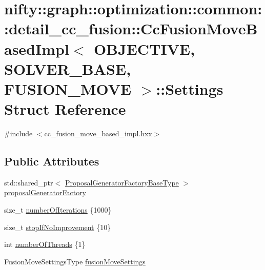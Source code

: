 \hypertarget{structnifty_1_1graph_1_1optimization_1_1common_1_1detail__cc__fusion_1_1CcFusionMoveBasedImpl_1_1Settings}{}\section{nifty\+:\+:graph\+:\+:optimization\+:\+:common\+:\+:detail\+\_\+cc\+\_\+fusion\+:\+:Cc\+Fusion\+Move\+Based\+Impl$<$ O\+B\+J\+E\+C\+T\+I\+V\+E, S\+O\+L\+V\+E\+R\+\_\+\+B\+A\+S\+E, F\+U\+S\+I\+O\+N\+\_\+\+M\+O\+V\+E $>$\+:\+:Settings Struct Reference}
\label{structnifty_1_1graph_1_1optimization_1_1common_1_1detail__cc__fusion_1_1CcFusionMoveBasedImpl_1_1Settings}


{\ttfamily \#include $<$cc\+\_\+fusion\+\_\+move\+\_\+based\+\_\+impl.\+hxx$>$}

\subsection*{Public Attributes}
\begin{DoxyCompactItemize}
\item 
std\+::shared\+\_\+ptr$<$ \hyperlink{classnifty_1_1graph_1_1optimization_1_1common_1_1detail__cc__fusion_1_1CcFusionMoveBasedImpl_a947607cc31008070837e3889069f9f94}{Proposal\+Generator\+Factory\+Base\+Type} $>$ \hyperlink{structnifty_1_1graph_1_1optimization_1_1common_1_1detail__cc__fusion_1_1CcFusionMoveBasedImpl_1_1Settings_a435be867da9b6e152ea20fd511237edc}{proposal\+Generator\+Factory}
\item 
size\+\_\+t \hyperlink{structnifty_1_1graph_1_1optimization_1_1common_1_1detail__cc__fusion_1_1CcFusionMoveBasedImpl_1_1Settings_aa8c847c84a066b119240851adc3db8c9}{number\+Of\+Iterations} \{1000\}
\item 
size\+\_\+t \hyperlink{structnifty_1_1graph_1_1optimization_1_1common_1_1detail__cc__fusion_1_1CcFusionMoveBasedImpl_1_1Settings_a62fc2587e4db8be098135949208a22a8}{stop\+If\+No\+Improvement} \{10\}
\item 
int \hyperlink{structnifty_1_1graph_1_1optimization_1_1common_1_1detail__cc__fusion_1_1CcFusionMoveBasedImpl_1_1Settings_aed78cc30daf387f3d2da5cdf5c37b6a0}{number\+Of\+Threads} \{1\}
\item 
Fusion\+Move\+Settings\+Type \hyperlink{structnifty_1_1graph_1_1optimization_1_1common_1_1detail__cc__fusion_1_1CcFusionMoveBasedImpl_1_1Settings_a357b2cdad3c7acbd88a3db6009fc34fc}{fusion\+Move\+Settings}
\end{DoxyCompactItemize}


